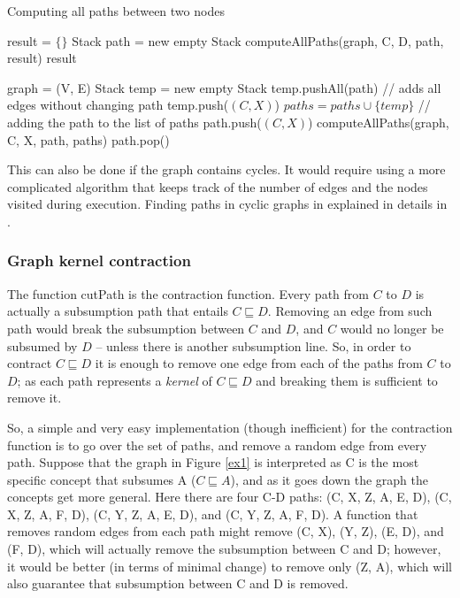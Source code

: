 \begin{algorithm}
\caption{Computing all paths between two nodes}
\label{GetPaths}
\begin{algorithmic}[1]
\State result = $\{\}$
\State Stack path = new empty Stack
\State computeAllPaths(graph, C, D, path, result)
\State \Return result
\EndFunction
\end{algorithmic}

\begin{algorithmic}[1]
\State graph = (V, E)
\State Stack temp = new empty Stack
\State temp.pushAll(path)  // adds all edges without changing path
\State temp.push($(C, X)$)
\State $paths = paths \cup \{temp\}$  // adding the path to the list of paths
\Else
\State path.push($(C, X)$)
\State computeAllPaths(graph, C, X, path, paths)
\State path.pop()
\EndIf
\EndFor
\EndFunction
\end{algorithmic}
\end{algorithm}

This can also be done if the graph contains cycles. It would require using a more complicated algorithm that keeps track of the number of edges and the nodes visited during execution. Finding paths in cyclic graphs in explained in details in \cite{alg}.

\subsubsection{Graph kernel contraction}
The function cutPath is the contraction function. Every path from $C$ to $D$ is actually a subsumption path that entails $C \sqsubseteq D$. Removing an edge from such path would break the subsumption between $C$ and $D$, and $C$ would no longer be subsumed by $D$ -- unless there is another subsumption line. So, in order to contract $C \sqsubseteq D$ it is enough to remove one edge from each of the paths from $C$ to $D$; as each path represents a \textit{kernel} of $C \sqsubseteq D$ and breaking them is sufficient to remove it. 

So, a simple and very easy implementation (though inefficient) for the contraction function is to go over the set of paths, and remove a random edge from every path. Suppose that the graph in Figure \ref{ex1} is interpreted as C is the most specific concept that subsumes A ($C \sqsubseteq A$), and as it goes down the graph the concepts get more general. Here there are four C-D paths: (C, X, Z, A, E, D), (C, X, Z, A, F, D), (C, Y, Z, A, E, D), and (C, Y, Z, A, F, D). A function that removes random edges from each path might remove (C, X), (Y, Z), (E, D), and (F, D), which will actually remove the subsumption between C and D; however, it would be better (in terms of minimal change) to remove only (Z, A), which will also guarantee that subsumption between C and D is removed.

